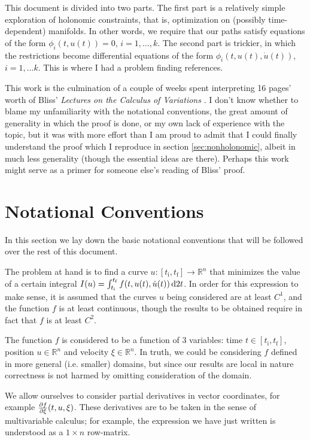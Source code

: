 \documentclass{article}
\theoremstyle{plain}
\theoremstyle{plain}
\theoremstyle{nonumberplain}
\theoremstyle{empty}
\newcommand{\R}{\mathbb{R}}
\newcommand{\tstart}{\mathrm{i}}
\newcommand{\tend}{\mathrm{f}}
\begin{document}
This document is divided into two parts. The first part is a relatively simple exploration of holonomic constraints, that is, optimization on (possibly time-dependent) manifolds. In other words, we require that our paths satisfy equations of the form $\phi_i(t, u(t)) = 0$, $i = 1, \dots, k$. The second part is trickier, in which the restrictions become differential equations of the form $\phi_i(t,u(t), \dot u(t))$, $i = 1, \dots k$. This is where I had a problem finding references.

This work is the culmination of a couple of weeks spent interpreting 16 pages' worth of Bliss' \textit{Lectures on the Calculus of Variations} \cite[pp.~187-202]{bliss}. I don't know whether to blame my unfamiliarity with the notational conventions, the great amount of generality in which the proof is done, or my own lack of experience with the topic, but it was with more effort than I am proud to admit that I could finally understand the proof which I reproduce in section \ref{sec:nonholonomic}, albeit in much less generality (though the essential ideas are there). Perhaps this work might serve as a primer for someone else's reading of Bliss' proof.

\section{Notational Conventions}

In this section we lay down the basic notational conventions that will be followed over the rest of this document.

The problem at hand is to find a curve $u \colon [t_\tstart, t_\tend] \to \R^n$ that minimizes the value of a certain integral $I(u) = \int_{t_\tstart}^{t_\tend} f(t, u(t), \dot u(t)) \dl2 t$. In order for this expression to make sense, it is assumed that the curves $u$ being considered are at least $C^1$, and the function $f$ is at least continuous, though the results to be obtained require in fact that $f$ is at least $C^2$.

The function $f$ is considered to be a function of 3 variables: time $t \in [t_\tstart, t_\tend]$, position $u \in \R^n$ and velocity $\xi \in \R^n$. In truth, we could be considering $f$ defined in more general (i.e. smaller) domains, but since our results are local in nature correctness is not harmed by omitting consideration of the domain.

We allow ourselves to consider partial derivatives in vector coordinates, for example $\diffp f \xi (t, u, \xi)$. These derivatives are to be taken in the sense of multivariable calculus; for example, the expression we have just written is understood as a $1 \times n$ row-matrix.
\end{document}
